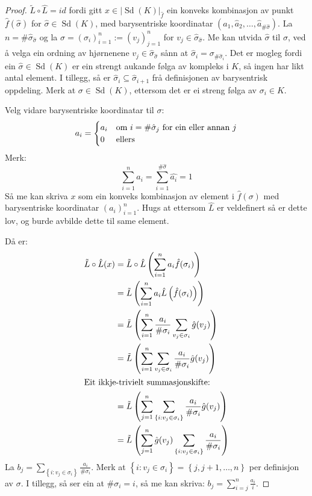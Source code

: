 \documentclass[a4paper, 12pt, norsk]{article}
\theoremstyle{plain}
\theoremstyle{definition}
\newcommand{\gr}[1]{ \lvert #1 \rvert } %
\newcommand{\set}[1]{ \left \{ #1 \right \} } %
\newcommand{\tuple}[1]{ \left( #1 \right) } %
\DeclareMathOperator{\Sd}{Sd}
\begin{document}
\begin{proof}
	\( \tilde{L}\circ\hat{L} = id \) fordi gitt \( x \in \gr{\Sd(K)}_{\hat{f}} \) ein konveks kombinasjon av punkt \( \hat{f}(\hat{\sigma}) \) for \( \hat{\sigma} \in \Sd(K) \), med barysentriske koordinatar \( \tuple{\hat{a}_1, \hat{a}_2, \dots, \hat{a}_{\#\hat{\sigma}}} \). La \( n = \#\hat{\sigma}_{\hat{\sigma}} \) og la \( \sigma = \tuple{\sigma_i}_{i=1}^{n} := \tuple{v_j}_{j=1}^{n} \) for \( v_j \in \hat{\sigma}_{\hat{\sigma}} \). Me kan utvida \( \hat{\sigma} \) til \( \sigma \), ved å velga ein ordning av hjørnenene \( v_j \in \hat{\sigma}_{\hat{\sigma}} \) sånn at \( \hat{\sigma}_i = \sigma_{\#\hat{\sigma}_i} \). Det er mogleg fordi ein \( \hat{\sigma} \in \Sd(K) \) er ein strengt aukande følga av kompleks i \( K \), så ingen har likt antal element. I tillegg, så er \( \hat{\sigma}_i \subseteq \hat{\sigma}_{i+1} \) frå definisjonen av barysentrisk oppdeling. Merk at \( \sigma \in \Sd(K) \), ettersom det er ei streng følga av \( \sigma_i \in K \).

	Velg vidare barysentriske koordinatar til \( \sigma \):
	\[
		a_i =
		\begin{cases}
			a_i & \text{om \( i = \#\hat{\sigma}_j \) for ein eller annan \( j \)} \\
			0 & \text{ellers}
		\end{cases}
	\]
	Merk:
	\[
		\sum_{i=1}^n a_i = \sum_{i=1}^{\#\hat{\sigma}}\hat{a_i}=1
	\]
	Så me kan skriva \( x \) som ein konveks kombinasjon av element i \( \hat{f}(\sigma) \) med barysentriske koordinatar \( \tuple{a_i}_{i=1}^n \). Hugs at ettersom \( \hat{L} \) er veldefinert så er dette lov, og burde avbilde dette til same element.

	Då er:
	\begin{align*}
		\tilde{L}\circ\hat{L}(x) &= \tilde{L}\circ\hat{L}\tuple{\sum_{i=1}^n a_i \hat{f}(\sigma_i)} \\
		&= \tilde{L}\tuple{\sum_{i=1}^n a_i \hat{L}\tuple{\hat{f}(\sigma_i)}} \\
		&= \tilde{L}\tuple{\sum_{i=1}^n \frac{a_i}{\#\sigma_i}\sum_{v_j \in \sigma_i}\hat{g}(v_j)} \\
		&= \tilde{L}\tuple{\sum_{i=1}^n\sum_{v_j \in \sigma_i}\frac{a_i}{\#\sigma_i}\hat{g}(v_j)} \\
		\intertext{Eit ikkje-trivielt summasjonskifte:}
		&= \tilde{L}\tuple{\sum_{j=1}^n\sum_{\set{i:v_j\in\sigma_i}}\frac{a_i}{\#\sigma_i}\hat{g}(v_j)} \\
		&= \tilde{L}\tuple{\sum_{j=1}^n \hat{g}(v_j) \sum_{\set{i:v_j\in\sigma_i}}\frac{a_i}{\#\sigma_i}}
	\end{align*}
	La \( b_j = \sum_{\set{i:v_j\in\sigma_i}}\frac{a_i}{\#\sigma_i} \). Merk at \( \set{i : v_j \in \sigma_i} = \set{j, j+1, \dots, n } \) per definisjon av \( \sigma \). I tillegg, så ser ein at \( \#\sigma_i = i \), så me kan skriva: \( b_j = \sum_{i=j}^n \frac{a_i}{i} \).


\end{proof}
\end{document}
